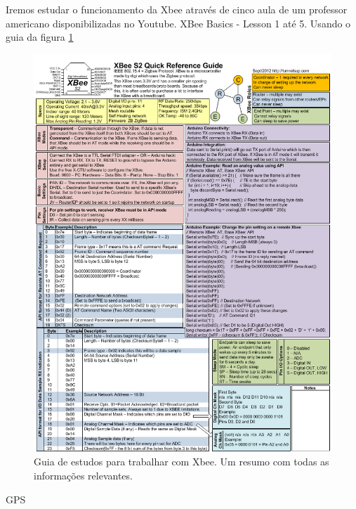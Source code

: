 Iremos estudar o funcionamento da Xbee através de cinco aula de um professor americano disponibilizadas no Youtube. XBee Basics - Lesson 1 até 5. Usando o guia da figura \ref{xbeeguide}

 \begin{figure} [!htp]
	\centering
	\includegraphics[scale=0.6]{figuras/xbeeguide}
	\caption{Guia de estudos para trabalhar com Xbee. Um resumo com todas as informações relevantes.}
	\label{xbeeguide}
\end{figure}
\FloatBarrier

GPS

